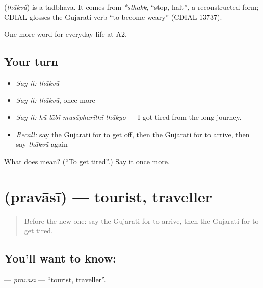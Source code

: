 \begin{cousinweb}
\textbf{} (\emph{thākvũ}) is a tadbhava. It comes from \emph{*sthakk}, \textquotedblleft{}stop, halt\textquotedblright{}, a reconstructed form; CDIAL glosses the Gujarati verb \textquotedblleft{}to become weary\textquotedblright{} (CDIAL 13737).
\end{cousinweb}

\begin{grammarlens}[title={What you've built}]
One more word for everyday life at A2.
\end{grammarlens}

\subsection*{Your turn}
\begin{itemize}
\raggedright
  \item \emph{Say it:} \emph{thākvũ}
  \item \emph{Say it:} \emph{thākvũ}, once more
  \item \emph{Say it:} \emph{hũ lā̃bī musāpharīthī thākyo} — I got tired from the long journey.
  \item \emph{Recall:} say the Gujarati for to get off, then the Gujarati for to arrive, then say \emph{thākvũ} again
\end{itemize}

\begin{tcolorbox}[breakable,colback=teal!4,colframe=teal!35!black,title={Before you move on}]
What does  mean? (\textquotedblleft{}To get tired\textquotedblright{}.) Say it once more.
\end{tcolorbox}
\section[\texorpdfstring{\gu{પ્રવાસી} (pravāsī)}{પ્રવાસી (pravāsī)}]{ (pravāsī) — tourist, traveller}

\label{lesson:GU-C206-pravasi}



\begin{quote}
Before the new one: say the Gujarati for to arrive, then the Gujarati for to get tired.
\end{quote}

\subsection*{You'll want to know: }
\textbf{} — \emph{pravāsī} — \textquotedblleft{}tourist, traveller\textquotedblright{}.

